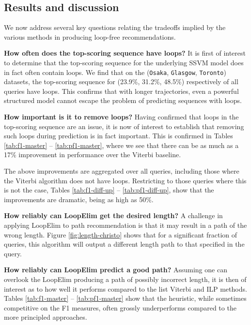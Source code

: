 

%
\subsection{Results and discussion}

We now address several key questions relating the tradeoffs implied by the various methods in producing loop-free recommendations.

\textbf{How often does the top-scoring sequence have loops?}
It is first of interest to determine that the top-scoring sequence for the underlying SSVM model does in fact often contain loops.
We find that on the ({\tt Osaka}, {\tt Glasgow}, {\tt Toronto}) datasets, the top-scoring sequence for (23.9\%, 31.2\%, 48.5\%) respectively of all queries have loops.
This confirms that with longer trajectories, even a powerful structured model cannot escape the problem of predicting sequences with loops.


\textbf{How important is it to remove loops?}
Having confirmed that loops in the top-scoring sequence are an issue,
it is now of interest to establish that removing such loops during prediction is in fact important.
This is confirmed in Tables \ref{tab:f1-master} -- \ref{tab:pf1-master},
where we see that there can be as much as a 17\% improvement in performance over the {\sc Viterbi} baseline.

The above improvements are aggregated over all queries, including those where the {\sc Viterbi} algorithm does not have loops.
Restricting to those queries where this is not the case,
Tables \ref{tab:f1-diff-up} -- \ref{tab:pf1-diff-up},
show that the improvements are dramatic, being as high as 50\%.

\textbf{How reliably can {\sc LoopElim} get the desired length?}
A challenge in applying {\sc LoopElim} to path recommendation
is that it may result in a path of the wrong length.
Figure \ref{fig:length-christo} shows that for a significant fraction of queries, this algorithm will output a different length path to that specified in the query.

\textbf{How reliably can {\sc LoopElim} predict a good path?}
Assuming one can overlook the {\sc LoopElim} producing a path of possibly incorrect length,
it is then of interest as to how well it performs compared to the list Viterbi and ILP methods.
Tables \ref{tab:f1-master} -- \ref{tab:pf1-master} show that the heuristic, while sometimes competitive on the F1 measures, often
grossly underperforms compared to the more principled approaches.

